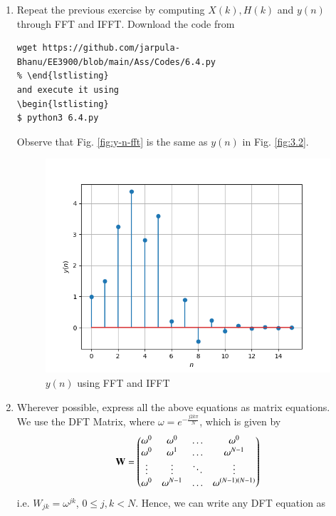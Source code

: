 \documentclass[journal,12pt,twocolumn]{IEEEtran}
\renewcommand\thesection{\arabic{section}}
\begin{document}
\begin{enumerate}[label=\thesection.\arabic*
,ref=\thesection.\theenumi]
\item Repeat the previous exercise by computing $X(k), H(k)$ and $y(n)$ through FFT and 
 IFFT.
 \solution Download the code from
\begin{lstlisting}
wget https://github.com/jarpula-Bhanu/EE3900/blob/main/Ass/Codes/6.4.py
% \end{lstlisting}
and execute it using
\begin{lstlisting}
$ python3 6.4.py
\end{lstlisting}
Observe that Fig. \eqref{fig:y-n-fft} is the same as $y(n)$ in Fig. \eqref{fig:3.2}.
\begin{figure}
\centering
\includegraphics[width=\columnwidth]{figs/6.4.png}
\caption{$y(n)$ using FFT and IFFT}
\label{fig:y-n-fft}
\end{figure}
\item Wherever possible, express all the above equations as matrix equations.\\
\solution
We use the DFT Matrix, where $\omega = e^{-\frac{j2k\pi}{N}}$, which is given by
\begin{align}
	\mathbf{W} = 
	\begin{pmatrix}
		\omega^0 & \omega^0 & \ldots & \omega^0 \\
		\omega^0 & \omega^1 & \ldots & \omega^{N - 1} \\
		\vdots & \vdots & \ddots & \vdots \\
		\omega^0 & \omega^{N - 1} & \ldots & \omega^{(N -1)(N - 1)}
	\end{pmatrix}
\end{align}
i.e. $W_{jk} = \omega^{jk}$, $0 \leq j, k < N$. Hence, we can write any DFT equation as

\end{enumerate}
\end{document}
